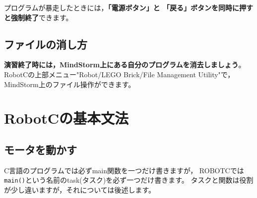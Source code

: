 \documentclass[11pt]{jsarticle}
\begin{document}
\begin{center}
\end{center}

プログラムが暴走したときには，\textbf{「電源ボタン」と
「戻る」ボタンを同時に押すと強制終了}できます。

\subsection{ファイルの消し方}

\textbf{演習終了時には，MindStorm上にある自分のプログラムを消去しましょう}。
RobotCの上部メニュー"Robot/LEGO Brick/File Management Utility"で，MindStorm上のファイル操作ができます。


\newpage
\section{RobotCの基本文法}

\subsection{モータを動かす}
C言語のプログラムでは必ずmain関数を一つだけ書きますが，
ROBOTCでは\verb|main()|という名前のtask(タスク)を必ず一つだけ書きます。
タスクと関数は役割が少し違いますが，それについては後述します。
\end{document}
